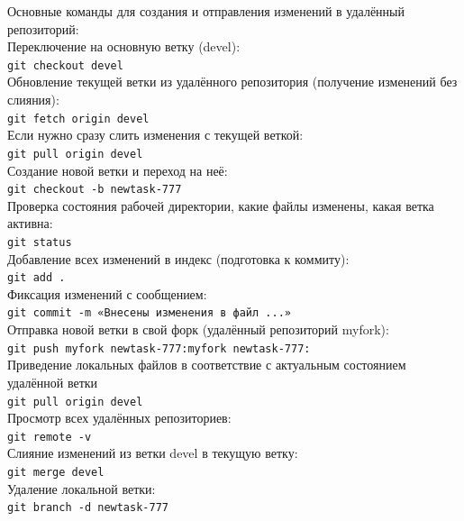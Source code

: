 Основные команды для создания и отправления изменений в удалённый репозиторий:
\\Переключение на основную ветку (devel):
\\ \texttt{git checkout devel}
\\ \quad Обновление текущей ветки из удалённого репозитория (получение изменений без слияния):
\\ \texttt{git fetch origin devel}
\\ \quad Если нужно сразу слить изменения с текущей веткой:
\\ \texttt{git pull origin devel}
\\ \quad Создание новой ветки и переход на неё:
\\ \texttt{git checkout -b newtask-777}
\\ \quad Проверка состояния рабочей директории, какие файлы изменены, какая ветка активна:
\\ \texttt{git status}
\\ \quad Добавление всех изменений в индекс (подготовка к коммиту):
\\ \texttt{git add .}
\\ \quad Фиксация изменений с сообщением:
\\ \texttt{git commit -m «Внесены изменения в файл ...»}
\\ \quad Отправка новой ветки в свой форк (удалённый репозиторий myfork):
\\ \texttt{git push myfork newtask-777:myfork newtask-777:}
\\ \quad Приведение локальных файлов в соответствие с актуальным состоянием удалённой ветки 
\\ \texttt{git pull origin devel}
\\ \quad Просмотр всех удалённых репозиториев:
\\ \texttt{git remote -v}
\\ \quad Слияние изменений из ветки devel в текущую ветку: 
\\ \texttt{git merge devel}
\\ \quad Удаление локальной ветки: 
\\ \texttt{git branch -d newtask-777}